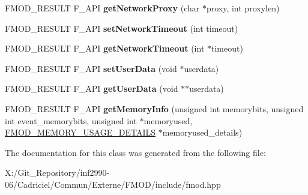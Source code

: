 \begin{DoxyCompactItemize}
\item 
\hypertarget{class_f_m_o_d_1_1_system_a6346a910caaff928a7498f2bfeaf8a69}{F\-M\-O\-D\-\_\-\-R\-E\-S\-U\-L\-T F\-\_\-\-A\-P\-I {\bfseries get\-Network\-Proxy} (char $\ast$proxy, int proxylen)}\label{class_f_m_o_d_1_1_system_a6346a910caaff928a7498f2bfeaf8a69}

\item 
\hypertarget{class_f_m_o_d_1_1_system_aad7cb557e4992666cfc304dfbac6d04e}{F\-M\-O\-D\-\_\-\-R\-E\-S\-U\-L\-T F\-\_\-\-A\-P\-I {\bfseries set\-Network\-Timeout} (int timeout)}\label{class_f_m_o_d_1_1_system_aad7cb557e4992666cfc304dfbac6d04e}

\item 
\hypertarget{class_f_m_o_d_1_1_system_aaabd940cb1f8768ae35bf68782d72ab6}{F\-M\-O\-D\-\_\-\-R\-E\-S\-U\-L\-T F\-\_\-\-A\-P\-I {\bfseries get\-Network\-Timeout} (int $\ast$timeout)}\label{class_f_m_o_d_1_1_system_aaabd940cb1f8768ae35bf68782d72ab6}

\item 
\hypertarget{class_f_m_o_d_1_1_system_ab2f36a02a4badbc4fc4727f37f62b7c3}{F\-M\-O\-D\-\_\-\-R\-E\-S\-U\-L\-T F\-\_\-\-A\-P\-I {\bfseries set\-User\-Data} (void $\ast$userdata)}\label{class_f_m_o_d_1_1_system_ab2f36a02a4badbc4fc4727f37f62b7c3}

\item 
\hypertarget{class_f_m_o_d_1_1_system_a04c439bfbbfa385ce819b29b26584fc5}{F\-M\-O\-D\-\_\-\-R\-E\-S\-U\-L\-T F\-\_\-\-A\-P\-I {\bfseries get\-User\-Data} (void $\ast$$\ast$userdata)}\label{class_f_m_o_d_1_1_system_a04c439bfbbfa385ce819b29b26584fc5}

\item 
\hypertarget{class_f_m_o_d_1_1_system_a248a17e258aa12ccc32c85c7a5a4f64c}{F\-M\-O\-D\-\_\-\-R\-E\-S\-U\-L\-T F\-\_\-\-A\-P\-I {\bfseries get\-Memory\-Info} (unsigned int memorybits, unsigned int event\-\_\-memorybits, unsigned int $\ast$memoryused, \hyperlink{struct_f_m_o_d___m_e_m_o_r_y___u_s_a_g_e___d_e_t_a_i_l_s}{F\-M\-O\-D\-\_\-\-M\-E\-M\-O\-R\-Y\-\_\-\-U\-S\-A\-G\-E\-\_\-\-D\-E\-T\-A\-I\-L\-S} $\ast$memoryused\-\_\-details)}\label{class_f_m_o_d_1_1_system_a248a17e258aa12ccc32c85c7a5a4f64c}

\end{DoxyCompactItemize}


The documentation for this class was generated from the following file\-:\begin{DoxyCompactItemize}
\item 
X\-:/\-Git\-\_\-\-Repository/inf2990-\/06/\-Cadriciel/\-Commun/\-Externe/\-F\-M\-O\-D/include/fmod.\-hpp\end{DoxyCompactItemize}
